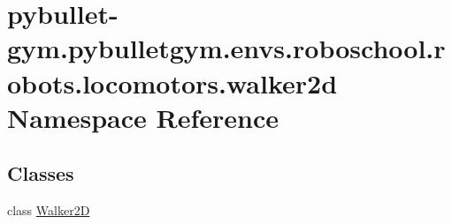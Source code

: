 \hypertarget{namespacepybullet-gym_1_1pybulletgym_1_1envs_1_1roboschool_1_1robots_1_1locomotors_1_1walker2d}{}\section{pybullet-\/gym.pybulletgym.\+envs.\+roboschool.\+robots.\+locomotors.\+walker2d Namespace Reference}
\label{namespacepybullet-gym_1_1pybulletgym_1_1envs_1_1roboschool_1_1robots_1_1locomotors_1_1walker2d}
\subsection*{Classes}
\begin{DoxyCompactItemize}
\item 
class \hyperlink{classpybullet-gym_1_1pybulletgym_1_1envs_1_1roboschool_1_1robots_1_1locomotors_1_1walker2d_1_1_walker2_d}{Walker2D}
\end{DoxyCompactItemize}
